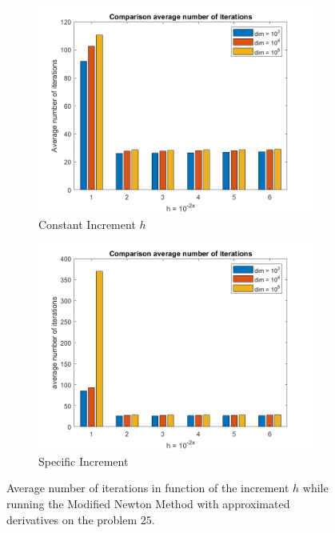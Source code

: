 \begin{figure}[htbp]
    \centering
    \begin{subfigure}[t]{0.45\textwidth}  %
        \centering
        \includegraphics[width=\textwidth]{img/pb25_MN_difffinite_COST_avgiterations.png}
        \caption{Constant Increment $h$}
    \end{subfigure}
    \hspace{1cm} %
    \begin{subfigure}[t]{0.45\textwidth}
        \centering
        \includegraphics[width=\textwidth]{img/pb25_MN_difffinite_REL_avgiterations.png}
        \caption{Specific Increment}
    \end{subfigure}
    \caption{ \small Average number of iterations in function of the increment $h$  while running the Modified Newton Method with approximated derivatives on the problem $25$.}
    \label{avgiterations25}
\end{figure}


